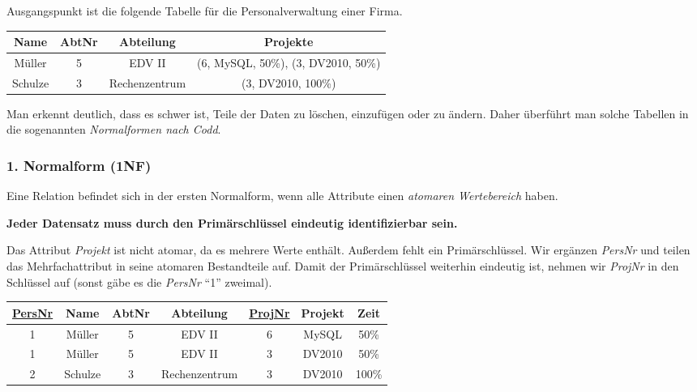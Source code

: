 \documentclass[9pt,a4paper]{arbeitsblatt}
\begin{document}
\ReiheTitel

Ausgangspunkt ist die folgende Tabelle für die Personalverwaltung einer Firma.

\begin{center}
\begin{tabular}{|c|c|c|c|}\hline
	\rowcolor{ab.tabelle.kopf.hg} Name & AbtNr & Abteilung & Projekte \\\hline
	Müller & 5 & EDV II & (6, MySQL, 50\%), (3, DV2010, 50\%) \\\hline
	Schulze & 3 & Rechenzentrum & (3, DV2010, 100\%) \\\hline
\end{tabular}
\end{center}

Man erkennt deutlich, dass es schwer ist, Teile der Daten zu löschen, einzufügen oder zu ändern.
Daher überführt man solche Tabellen in die sogenannten \emph{Normalformen nach Codd}.

\begin{infobox}\vspace*{-1em}
	\subsubsection*{1. Normalform (1NF)}

	Eine Relation befindet sich in der ersten Normalform, wenn alle Attribute einen
	\emph{atomaren Wertebereich} haben.

	\textbf{Jeder Datensatz muss durch den Primärschlüssel eindeutig identifizierbar sein.}
\end{infobox}

Das Attribut \emph{Projekt} ist nicht atomar, da es mehrere Werte enthält. Außerdem fehlt ein
Primärschlüssel. Wir ergänzen \emph{PersNr} und teilen das Mehrfachattribut in seine atomaren
Bestandteile auf. Damit der Primärschlüssel weiterhin eindeutig ist, nehmen wir \emph{ProjNr}
in den Schlüssel auf (sonst gäbe es die \emph{PersNr} \enquote{1} zweimal).

\begin{center}
\begin{tabular}{|c|c|c|c|c|c|c|}\hline
	\rowcolor{ab.tabelle.kopf.hg} \underline{PersNr} & Name & AbtNr & Abteilung & \underline{ProjNr} & Projekt & Zeit \\\hline
	1 & Müller & 5 & EDV II & 6 & MySQL & 50\% \\\hline
	1 & Müller & 5 & EDV II & 3 & DV2010 & 50\% \\\hline
	2 & Schulze & 3 & Rechenzentrum & 3 & DV2010 & 100\% \\\hline
\end{tabular}
\end{center}
\end{document}
